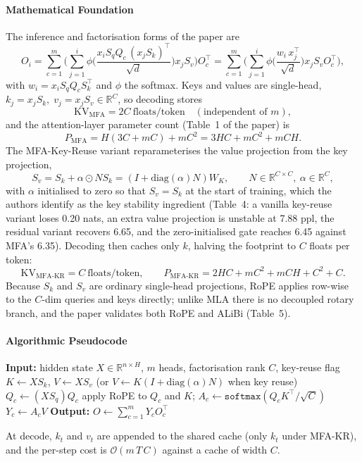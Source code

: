 \paragraph{Mathematical Foundation}
The inference and factorisation forms of the paper are
\[
O_i=\sum_{c=1}^{m}\Big(\sum_{j=1}^{i}\phi\Big(\frac{x_iS_qQ_c\,(x_jS_k)^{\top}}{\sqrt{d}}\Big)x_jS_v\Big)O_c^{\top}
=\sum_{c=1}^{m}\Big(\sum_{j=1}^{i}\phi\Big(\frac{w_i\,x_j^{\top}}{\sqrt{d}}\Big)x_jS_vO_c^{\top}\Big),
\]
with $w_i=x_iS_qQ_cS_k^{\top}$ and $\phi$ the softmax. Keys and values are single-head, $k_j=x_jS_k,\;v_j=x_jS_v\in\mathbb{R}^{C}$, so decoding stores
\[
\mathrm{KV}_{\mathrm{MFA}}=2C\ \text{floats/token}\quad(\text{independent of }m),
\]
and the attention-layer parameter count (Table~1 of the paper) is
\[
P_{\mathrm{MFA}}=H(3C+mC)+mC^{2}=3HC+mC^{2}+mCH .
\]
The MFA-Key-Reuse variant reparameterises the value projection from the key projection,
\[
S_v=S_k+\alpha\odot NS_k=(I+\mathrm{diag}(\alpha)N)W_K,\qquad N\in\mathbb{R}^{C\times C},\ \alpha\in\mathbb{R}^{C},
\]
with $\alpha$ initialised to zero so that $S_v=S_k$ at the start of training, which the authors identify as the key stability ingredient (Table~4: a vanilla key-reuse variant loses 0.20 nats, an extra value projection is unstable at 7.88 ppl, the residual variant recovers 6.65, and the zero-initialised gate reaches 6.45 against MFA's 6.35). Decoding then caches only $k$, halving the footprint to $C$ floats per token:
\[
\mathrm{KV}_{\mathrm{MFA\text{-}KR}}=C\ \text{floats/token},\qquad
P_{\mathrm{MFA\text{-}KR}}=2HC+mC^{2}+mCH+C^{2}+C .
\]
Because $S_k$ and $S_v$ are ordinary single-head projections, RoPE applies row-wise to the $C$-dim queries and keys directly; unlike MLA there is no decoupled rotary branch, and the paper validates both RoPE and ALiBi (Table~5).

\paragraph{Algorithmic Pseudocode}
\begin{algorithmic}[1]
\State \textbf{Input:} hidden state $X\in\mathbb{R}^{n\times H}$, $m$ heads, factorisation rank $C$, key-reuse flag
\State $K\gets XS_k$, \quad $V\gets XS_v$ (or $V\gets K(I+\mathrm{diag}(\alpha)N)$ when key reuse) 
    \State $Q_c\gets (XS_q)Q_c$ 
    \State apply RoPE to $Q_c$ and $K$; \quad $A_c\gets\texttt{softmax}(Q_cK^{\top}/\sqrt{C})$ 
    \State $Y_c\gets A_cV$
\EndFor
\State \textbf{Output:} $O\gets\sum_{c=1}^{m}Y_cO_c^{\top}$
\end{algorithmic}
At decode, $k_t$ and $v_t$ are appended to the shared cache (only $k_t$ under MFA-KR), and the per-step cost is $\mathcal{O}(m\,T\,C)$ against a cache of width $C$.

